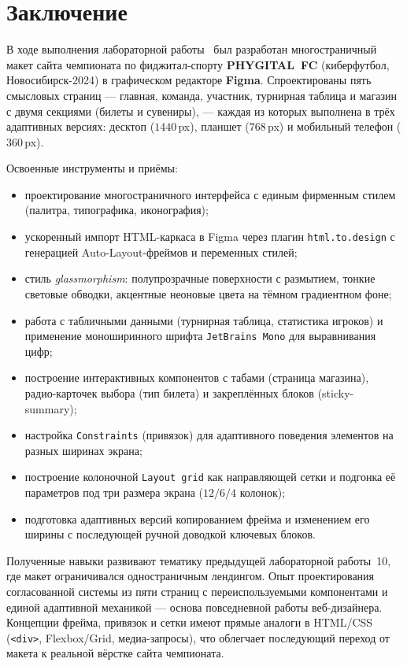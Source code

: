 \chapter*{Заключение}
\label{ch:conclusion}

В ходе выполнения лабораторной работы~\cfgLabNumber{} был разработан
многостраничный макет сайта чемпионата по фиджитал-спорту
\textbf{PHYGITAL~FC} (киберфутбол, Новосибирск-2024) в графическом
редакторе \textbf{Figma}. Спроектированы пять смысловых страниц ---
главная, команда, участник, турнирная таблица и магазин с двумя
секциями (билеты и сувениры), --- каждая из которых выполнена в трёх
адаптивных версиях: десктоп (\(1440\,\)px), планшет (\(768\,\)px) и
мобильный телефон (\(360\,\)px).

Освоенные инструменты и приёмы:
\begin{itemize}
  \item проектирование многостраничного интерфейса с единым
        фирменным стилем (палитра, типографика, иконография);
  \item ускоренный импорт HTML-каркаса в Figma через плагин
        \texttt{html.to.design} с генерацией Auto-Layout-фреймов
        и переменных стилей;
  \item стиль \emph{glassmorphism}: полупрозрачные поверхности с
        размытием, тонкие световые обводки, акцентные неоновые
        цвета на тёмном градиентном фоне;
  \item работа с табличными данными (турнирная таблица,
        статистика игроков) и применение моноширинного шрифта
        \texttt{JetBrains~Mono} для выравнивания цифр;
  \item построение интерактивных компонентов с табами
        (страница магазина), радио-карточек выбора (тип билета)
        и закреплённых блоков (sticky-summary);
  \item настройка \texttt{Constraints} (привязок) для адаптивного
        поведения элементов на разных ширинах экрана;
  \item построение колоночной \texttt{Layout grid} как
        направляющей сетки и подгонка её параметров под три
        размера экрана (\(12/6/4\) колонок);
  \item подготовка адаптивных версий копированием фрейма и
        изменением его ширины с последующей ручной доводкой
        ключевых блоков.
\end{itemize}

Полученные навыки развивают тематику предыдущей лабораторной
работы~10, где макет ограничивался одностраничным лендингом. Опыт
проектирования согласованной системы из пяти страниц с переиспользуемыми
компонентами и единой адаптивной механикой --- основа повседневной
работы веб-дизайнера. Концепции фрейма, привязок и сетки имеют прямые
аналоги в HTML/CSS (\texttt{<div>}, Flexbox/Grid, медиа-запросы), что
облегчает последующий переход от макета к реальной вёрстке сайта
чемпионата.

\endinput
